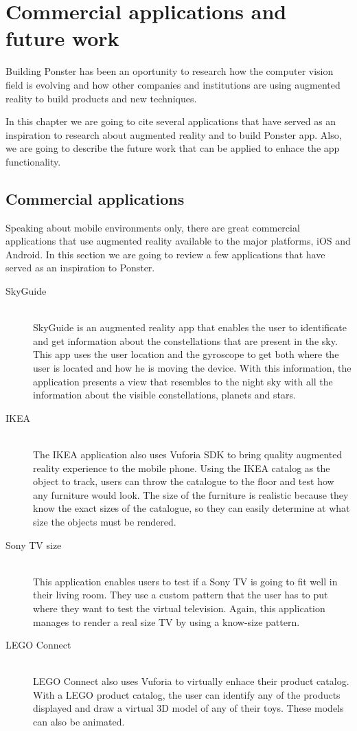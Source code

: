 \chapter{Commercial applications and future work}
Building Ponster has been an oportunity to research how the computer vision field is
evolving and how other companies and institutions are using augmented reality to
build products and new techniques. 

In this chapter we are going to cite several applications that have served as an
inspiration to research about augmented reality and to build Ponster app. Also, we
are going to describe the future work that can be applied to enhace the app
functionality. 

\section{Commercial applications}
\label{sec:comapps}
Speaking about mobile environments only, there are great commercial applications
that use augmented reality available to the major platforms, iOS and Android. In
this section we are going to review a few applications that have served as an
inspiration to Ponster. 

\begin{description}
\item [SkyGuide] \hfill \\
SkyGuide is an augmented reality app that enables the user to identificate and get
information about the constellations that are present in the sky. This app uses the
user location and the gyroscope to get both where the user is located and how he is
moving the device. With this information, the application presents a view that
resembles to the night sky with all the information about the visible
constellations, planets and stars.

\item [IKEA] \hfill \\
The IKEA application also uses Vuforia SDK to bring quality augmented reality
experience to the mobile phone. Using the IKEA catalog as the object to track, users
can throw the catalogue to the floor and test how any furniture would look. The size
of the furniture is realistic because they know the exact sizes of the catalogue, so
they can easily determine at what size the objects must be rendered.

\item [Sony TV size] \hfill \\
This application enables users to test if a Sony TV is going to fit well in their
living room. They use a custom pattern that the user has to put where they want to
test the virtual television. Again, this application manages to render a real size
TV by using a know-size pattern.

\item [LEGO Connect] \hfill \\
LEGO Connect also uses Vuforia to virtually enhace their product catalog. With a
LEGO product catalog, the user can identify any of the products displayed and draw a
virtual 3D model of any of their toys. These models can also be animated.
\end{description}

